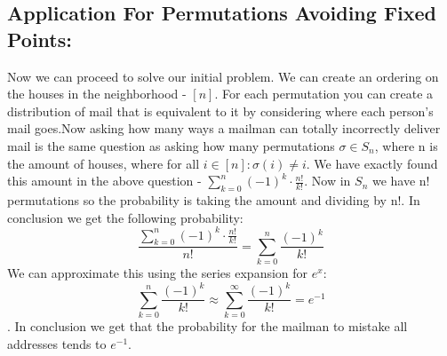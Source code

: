 \documentclass{article}
\begin{document}
\subsection{Application For Permutations Avoiding Fixed Points:}
Now we can proceed to solve our initial problem. We can create an ordering on the houses in the neighborhood - $[n]$.
For each permutation you can create a distribution of mail that is equivalent to it by considering where each person's mail goes.Now asking how many ways a mailman can totally incorrectly deliver mail is the same question as asking how many permutations $\sigma\in S_n$, where n is the amount of houses, where for all $i \in [n]: \sigma(i) \neq i$. We have exactly found this amount in the above question - $\sum_{k=0}^{n} (-1)^k \cdot\frac{n!}{k!}.$ Now in $S_n$ we have n! permutations so the probability is taking the amount and dividing by n!. In conclusion we get the following probability: \[\frac{{\sum_{k=0}^{n} (-1)^k \cdot \frac{n!}{k!}}}{n!}= \sum_{k=0}^{n} \frac{(-1)^k}{k!}\] We can approximate this using the series expansion for $e^x$:
\[\sum_{k=0}^{n} \frac{(-1)^k}{k!} \approx \sum_{k=0}^{\infty} \frac{(-1)^k}{k!} = e^{-1}\]. 
In conclusion we get that the probability for the mailman to mistake all addresses tends to $e^{-1}$.
\end{document}
